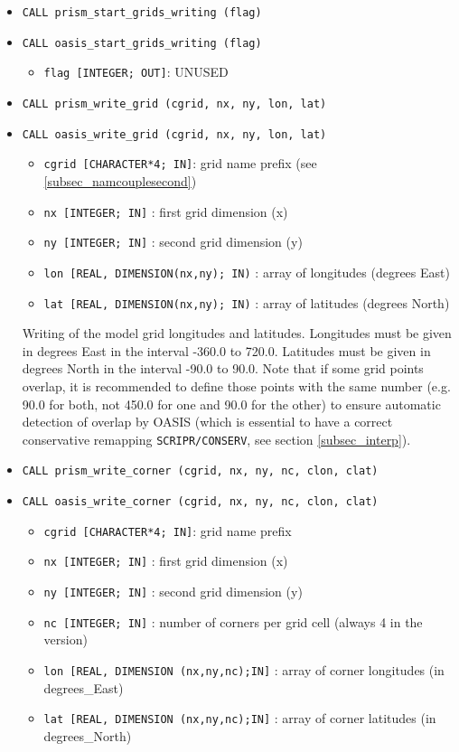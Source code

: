 \begin{itemize}
  
\item {\tt CALL  prism\_start\_grids\_writing (flag)}
\item {\tt CALL  oasis\_start\_grids\_writing (flag)}
        
  \begin{itemize}
    \item {\tt flag [INTEGER; OUT]}:  UNUSED
  \end{itemize}

\item {\tt CALL prism\_write\_grid (cgrid, nx, ny, lon, lat)}
\item {\tt CALL oasis\_write\_grid (cgrid, nx, ny, lon, lat)}
        
 \begin{itemize}
    \item {\tt cgrid [CHARACTER*4; IN]}: grid name prefix (see
    \ref{subsec_namcouplesecond})
    \item {\tt nx [INTEGER; IN]} : first grid dimension (x)
    \item {\tt ny [INTEGER; IN]} : second grid dimension (y)
    \item {\tt lon [REAL, DIMENSION(nx,ny); IN)} : array of longitudes
      (degrees East) 
    \item {\tt lat [REAL, DIMENSION(nx,ny); IN)} : array of latitudes
    (degrees North)
 \end{itemize}

 Writing of the model grid longitudes and latitudes. Longitudes must
 be given in degrees East in the interval -360.0 to 720.0. Latitudes
 must be given in degrees North in the interval -90.0 to 90.0. Note
 that if some grid points overlap, it is recommended to define those
 points with the same number (e.g. 90.0 for both, not 450.0 for one
 and 90.0 for the other) to ensure automatic detection of overlap by OASIS
 (which is essential to have a correct conservative remapping
 \texttt{SCRIPR/CONSERV}, see section \ref{subsec_interp}). 


\item {\tt CALL prism\_write\_corner (cgrid, nx, ny, nc, clon, clat)}
\item {\tt CALL oasis\_write\_corner (cgrid, nx, ny, nc, clon, clat)}

 \begin{itemize}
    \item {\tt cgrid [CHARACTER*4; IN]}: grid name prefix
    \item {\tt nx [INTEGER; IN]} : first grid dimension (x)
    \item {\tt ny [INTEGER; IN]} : second grid dimension (y)
    \item {\tt nc [INTEGER; IN]} : number of corners per grid cell (always 4 in the version)
    \item {\tt lon [REAL, DIMENSION (nx,ny,nc);IN]} : array of corner
    longitudes (in degrees\_East)
    \item {\tt lat [REAL, DIMENSION (nx,ny,nc);IN]} : array of corner
    latitudes (in degrees\_North)
 \end{itemize}


\end{itemize}
